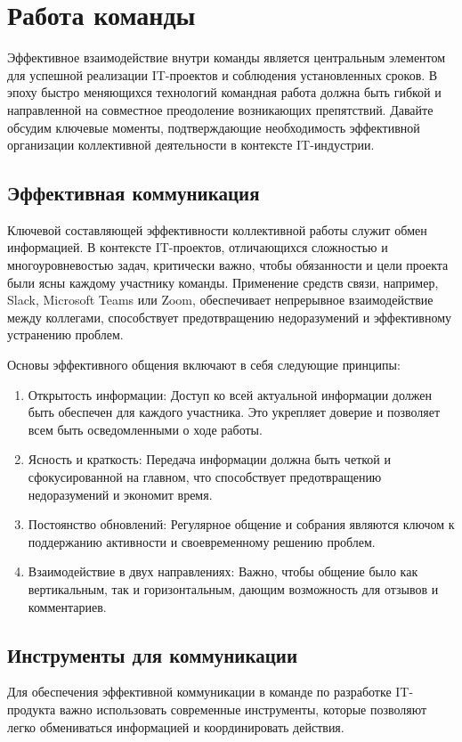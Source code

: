 \chapter{Работа команды}
\label{ch:team_work}
    
    Эффективное взаимодействие внутри команды является центральным элементом для успешной реализации IT-проектов и соблюдения установленных сроков. В эпоху быстро меняющихся технологий командная работа должна быть гибкой и направленной на совместное преодоление возникающих препятствий. Давайте обсудим ключевые моменты, подтверждающие необходимость эффективной организации коллективной деятельности в контексте IT-индустрии.

    \section{Эффективная коммуникация}
    Ключевой составляющей эффективности коллективной работы служит обмен информацией. В контексте IT-проектов, отличающихся сложностью и многоуровневостью задач, критически важно, чтобы обязанности и цели проекта были ясны каждому участнику команды. Применение средств связи, например, Slack, Microsoft Teams или Zoom, обеспечивает непрерывное взаимодействие между коллегами, способствует предотвращению недоразумений и эффективному устранению проблем.

    Основы эффективного общения включают в себя следующие принципы: \\
    \begin{enumerate}
        \item Открытость информации: Доступ ко всей актуальной информации должен быть обеспечен для каждого участника. Это укрепляет доверие и позволяет всем быть осведомленными о ходе работы.
        \item Ясность и краткость: Передача информации должна быть четкой и сфокусированной на главном, что способствует предотвращению недоразумений и экономит время.
        \item Постоянство обновлений: Регулярное общение и собрания являются ключом к поддержанию активности и своевременному решению проблем.
        \item Взаимодействие в двух направлениях: Важно, чтобы общение было как вертикальным, так и горизонтальным, дающим возможность для отзывов и комментариев.
    \end{enumerate}

    \section{Инструменты для коммуникации}
    Для обеспечения эффективной коммуникации в команде по разработке IT-продукта важно использовать современные инструменты, которые позволяют легко обмениваться информацией и координировать действия.

